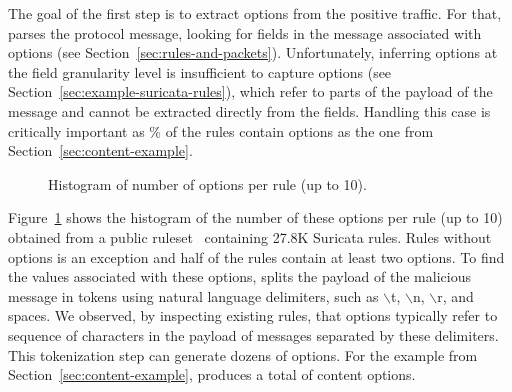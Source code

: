 \documentclass[sigconf,anonymous]{acmart}
\begin{document}
The goal of the first step is to extract options from the positive
traffic. For that, \tname{} parses the protocol message, looking for
fields in the message associated with options (see
Section~\ref{sec:rules-and-packets}).  Unfortunately, inferring
options at the field granularity level is insufficient to capture
 options (see
Section~\ref{sec:example-suricata-rules}), which refer to parts of the
payload of the message and cannot be extracted directly from the
fields. Handling this case is critically important as \% of the
rules contain  options as the one from
Section~\ref{sec:content-example}.



\pgfplotsset{width=6cm,compat=1.8}

\begin{figure}[t!]
  \centering
  \caption{\label{fig:distribution-contents}Histogram of number of
     options per rule (up to 10).}
\end{figure}  


Figure~\ref{fig:distribution-contents} shows the histogram of the
number of these options per rule (up to 10) obtained from a public
ruleset~\cite{emerging-threats-open} containing 27.8K Suricata
rules. Rules without  options is an exception and half
of the rules contain at least two  options.  To find
the values associated with these options, \tname{} splits the payload
of the malicious message in tokens using natural language delimiters,
such as $\backslash$t, $\backslash$n, $\backslash$r, and spaces. We
observed, by inspecting existing rules, that  options
typically refer to sequence of characters in the payload of messages
separated by these delimiters. This tokenization step can generate
dozens of options. For the example from
Section~\ref{sec:content-example}, \tname{} produces a total of
 content options.
\end{document}
